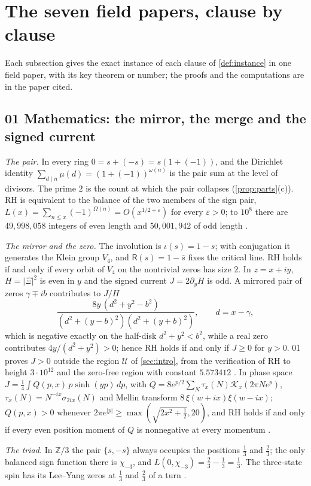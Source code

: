 \documentclass[11pt]{article}
\theoremstyle{definition}\newtheorem{definition}[theorem]{Definition}
\theoremstyle{remark}\newtheorem{remark}[theorem]{Remark}
\begin{document}
\section{The seven field papers, clause by clause}\label{sec:fields}
Each subsection gives the exact instance of each clause of \cref{def:instance} in one field paper, with its key theorem or number; the proofs and the computations are in the paper cited.

\subsection{01 Mathematics: the mirror, the merge and the signed current}\label{sec:f01}
\emph{The pair.} In every ring $0=s+(-s)=s(1+(-1))$, and the Dirichlet identity $\sum_{d\mid n}\mu(d)=(1+(-1))^{\omega(n)}$ is the pair sum at the level of divisors. The prime $2$ is the count at which the pair collapses (\cref{prop:parts}(c)). RH is equivalent to the balance of the two members of the sign pair, $L(x)=\sum_{n\le x}(-1)^{\Omega(n)}=O(x^{1/2+\varepsilon})$ for every $\varepsilon>0$; to $10^8$ there are $49{,}998{,}058$ integers of even length and $50{,}001{,}942$ of odd length \cite{SMath}.

\emph{The mirror and the zero.} The involution is $\iota(s)=1-s$; with conjugation it generates the Klein group $V_4$, and $\mathsf R(s)=1-\bar s$ fixes the critical line. RH holds if and only if every orbit of $V_4$ on the nontrivial zeros has size $2$. In $z=x+iy$, $H=|\Xi|^2$ is even in $y$ and the signed current $J=2\partial_yH$ is odd. A mirrored pair of zeros $\gamma\mp ib$ contributes to $J/H$
\[
\frac{8y\,(d^2+y^2-b^2)}{(d^2+(y-b)^2)(d^2+(y+b)^2)},\qquad d=x-\gamma,
\]
which is negative exactly on the half-disk $d^2+y^2<b^2$, while a real zero contributes $4y/(d^2+y^2)>0$; hence RH holds if and only if $J\ge0$ for $y>0$. 01 proves $J>0$ outside the region $\mathcal U$ of \cref{sec:intro}, from the verification of RH to height $3\cdot10^{12}$ \cite{PT} and the zero-free region with constant $5.573412$ \cite{MT}. In phase space $J=\frac14\int Q(p,x)\,p\sinh(yp)\,dp$, with $Q=8e^{p/2}\sum_N\tau_x(N)\mathcal K_x(2\pi Ne^p)$, $\tau_x(N)=N^{-ix}\sigma_{2ix}(N)$ and Mellin transform $8\,\xi(w+ix)\xi(w-ix)$; $Q(p,x)>0$ whenever $2\pi e^{|p|}\ge\max(\sqrt{2x^2+\frac12},20)$, and RH holds if and only if every even position moment of $Q$ is nonnegative at every momentum \cite{SMath}.

\emph{The triad.} In $\mathbb Z/3$ the pair $\{s,-s\}$ always occupies the positions $\frac13$ and $\frac23$; the only balanced sign function there is $\chi_{-3}$, and $L(0,\chi_{-3})=\frac23-\frac13=\frac13$. The three-state spin has its Lee--Yang zeros at $\frac13$ and $\frac23$ of a turn \cite{SMath}.
\end{document}
